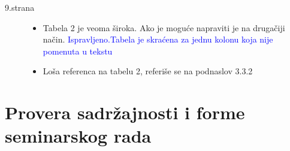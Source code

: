 \documentclass[a4paper]{report}
\newcommand{\odgovor}[1]{\textcolor{blue}{#1}}
\begin{document}
\begin{description}
\item [9.strana] 

\begin{itemize}
\item Tabela 2 je veoma široka. Ako je moguće napraviti je na drugačiji  način.
\odgovor {Ispravljeno.Tabela je skraćena za jednu kolonu koja nije pomenuta u tekstu}
\item Loša referenca na tabelu 2, referiše se na podnaslov 3.3.2
\end{itemize} 
\end{description}
\section{Provera sadržajnosti i forme seminarskog rada}
\end{document}
